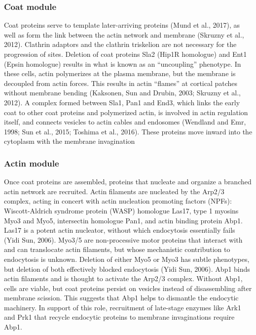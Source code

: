 			
			\subsubsection{Coat module}
Coat proteins serve to template later-arriving proteins (Mund et al., 2017), as well as form the link between the actin network and membrane (Skruzny et al., 2012). Clathrin adaptors and the clathrin triskelion are not necessary for the progression of sites. Deletion of coat proteins Sla2 (Hip1R homologue) and Ent1 (Epsin homologue) results in what is known as an “uncoupling” phenotype. In these cells, actin polymerizes at the plasma membrane, but the membrane is decoupled from actin forces. This results in actin “flames” at cortical patches without membrane bending (Kaksonen, Sun and Drubin, 2003; Skruzny et al., 2012). A complex formed between Sla1, Pan1 and End3, which links the early coat to other coat proteins and polymerized actin, is involved in actin regulation itself, and connects vesicles to actin cables and endosomes (Wendland and Emr, 1998; Sun et al., 2015; Toshima et al., 2016). These proteins move inward into the cytoplasm with the membrane invagination
			



			\subsubsection{Actin module}
Once coat proteins are assembled, proteins that nucleate and organize a branched actin network are recruited. Actin filaments are nucleated by the Arp2/3 complex, acting in concert with actin nucleation promoting factors (NPFs): Wiscott-Aldrich syndrome protein (WASP) homologue Las17, type 1 myosins Myo3 and Myo5, intersectin homologue Pan1, and actin binding protein Abp1. Las17 is a potent actin nucleator, without which endocytosis essentially fails (Yidi Sun, 2006). Myo3/5 are non-processive motor proteins that interact with and can translocate actin filaments, but whose mechanistic contribution to endocytosis is unknown. Deletion of either Myo5 or Myo3 has subtle phenotypes, but deletion of both effectively blocked endocytosis (Yidi Sun, 2006). Abp1 binds actin filaments and is thought to activate the Arp2/3 complex. Without Abp1, cells are viable, but coat proteins persist on vesicles instead of disassembling after membrane scission. This suggests that Abp1 helps to dismantle the endocytic machinery. In support of this role, recruitment of late-stage enzymes like Ark1 and Prk1 that recycle endocytic proteins to membrane invaginations require Abp1. 


